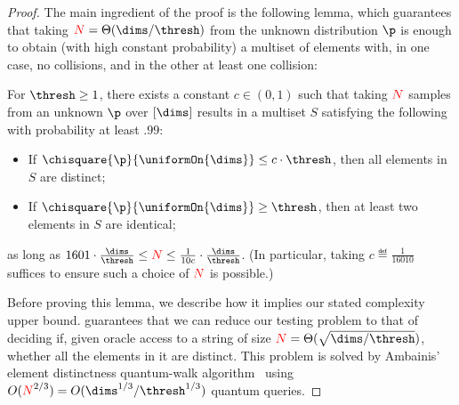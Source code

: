 \documentclass[11pt]{article}
\begin{document}
\begin{proof}
The main ingredient of the proof is the following lemma, which guarantees that taking $\bigns = \Theta({\dims}/{\thresh})$ from the unknown distribution $\p$ is enough to obtain (with high constant probability) a multiset of elements with, in one case, no collisions, and in the other at least one collision:
\begin{lemma}\label{lem:distinctelements}
For $\thresh \geq 1$, there exists a constant $c\in(0,1)$ such that taking ${\textcolor{red}{N}}$ \iid samples from an unknown $\p$ over $[\dims]$ results in a multiset $S$ satisfying the following with probability at least $.99$:
\begin{itemize}
	\item If $\chisquare{\p}{\uniformOn{\dims}} \leq c\cdot \thresh$, then all elements in $S$ are distinct;
	\item If $\chisquare{\p}{\uniformOn{\dims}} \geq \thresh$, then at least two elements in $S$ are identical;
\end{itemize}
as long as $1601\cdot \frac{\dims}{\thresh} \leq \bigns \leq \frac{1}{10c}\cdot \frac{\dims}{\thresh}$. (In particular, taking $c \eqdef \frac{1}{16010}$ suffices to ensure such a choice of ${\textcolor{red}{N}}$ is possible.)
\end{lemma}
Before proving this lemma, we describe how it implies our stated complexity upper bound.  guarantees that we can reduce our testing problem to that of deciding if, given oracle access to a string of size $\bigns = \Theta(\sqrt{\dims/\thresh})$, whether all the elements in it are distinct. This problem is solved by Ambainis' element distinctness quantum-walk algorithm~\cite{Amb07} using $O(\bigns^{2/3}) = O({\dims^{1/3}/\thresh^{1/3}})$ quantum queries.


\end{proof}
\end{document}
